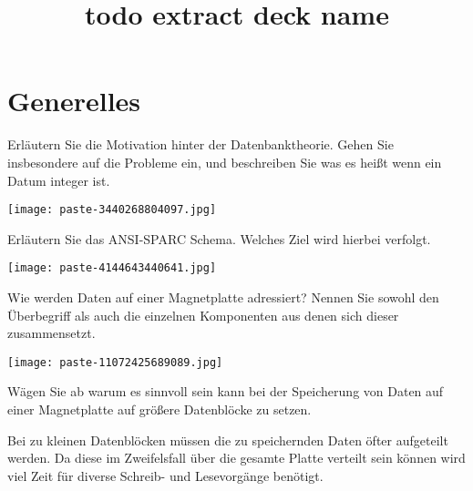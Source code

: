 \documentclass{article}
\title{todo extract deck name}
\begin{document}
\section{Generelles}
\begin{tcolorbox}[colback=white!10!white,colframe=lightgray!75!black,
  savelowerto=\jobname_ex.tex]

\begin{center}
 Erläutern Sie die Motivation hinter der Datenbanktheorie. Gehen Sie insbesondere auf die 
Probleme
 ein, und beschreiben Sie was es heißt wenn ein Datum 
integer
ist. 

\end{center}

\tcblower

\justifying
\texttt{[image: paste-3440268804097.jpg]}

\end{tcolorbox}
\begin{tcolorbox}[colback=white!10!white,colframe=lightgray!75!black,
  savelowerto=\jobname_ex.tex]

\begin{center}
 Erläutern Sie das 
ANSI-SPARC
Schema. Welches Ziel wird hierbei verfolgt. 

\end{center}

\tcblower

\justifying
\texttt{[image: paste-4144643440641.jpg]}

\end{tcolorbox}
\begin{tcolorbox}[colback=white!10!white,colframe=lightgray!75!black,
  savelowerto=\jobname_ex.tex]

\begin{center}
 Wie werden Daten auf einer Magnetplatte 
adressiert?
Nennen Sie sowohl den Überbegriff als auch die einzelnen Komponenten aus denen sich dieser zusammensetzt. 

\end{center}

\tcblower

\justifying
\texttt{[image: paste-11072425689089.jpg]}

\end{tcolorbox}
\begin{tcolorbox}[colback=white!10!white,colframe=lightgray!75!black,
  savelowerto=\jobname_ex.tex]

\begin{center}
 Wägen Sie ab warum es sinnvoll sein kann bei der Speicherung von Daten auf einer Magnetplatte auf größere Datenblöcke zu setzen. 

\end{center}

\tcblower

\justifying
Bei zu kleinen Datenblöcken müssen die zu speichernden Daten öfter aufgeteilt werden. Da diese im Zweifelsfall über die gesamte Platte verteilt sein können wird viel Zeit für diverse Schreib- und Lesevorgänge benötigt.

\end{tcolorbox}
\end{document}
